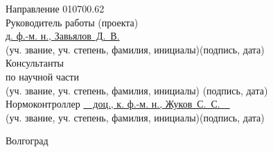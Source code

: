 \begin{titlepage}
\begin{flushleft}
		Направление 010700.62\\
		Руководитель работы (проекта)\\
		\underline{д. ф.-м. н., Завьялов~Д.~В.}\hfill\underline{\hspace{5cm}}\\
		\vspace{-.2cm}\hspace{.4cm}\footnotesize(уч. звание, уч. степень, 
			фамилия, инициалы)\hspace{6.5cm}(подпись, дата)\normalsize\\
		Консультанты\\
		по научной части \underline{\hspace{7cm}}\hfill%
			\underline{\hspace{5cm}}\\\vspace{-.2cm}\hspace{4cm}%
			\footnotesize(уч. звание, уч. степень, фамилия, инициалы)%
			\hspace{3cm}(подпись, дата)\normalsize\\
		Нормоконтроллер \underline{\ \ доц., к. ф.-м. н., Жуков~С.~С.\ \ }
			\hfill\underline{\hspace{5cm}}\\
		\vspace{-.2cm}\hspace{4cm}\footnotesize(уч. звание, уч. степень, 
			фамилия, инициалы)\hspace{3cm}(подпись, дата)\normalsize\\
	\end{flushleft}

	\vspace{\fill}

	\begin{center}
		Волгоград \the\year
	\end{center}
\end{titlepage}

